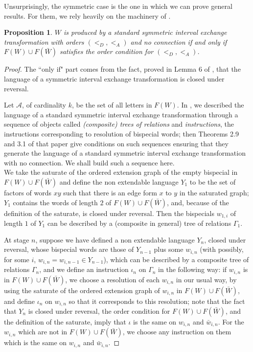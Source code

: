 \documentclass[12pt,a4paper]{amsart}
\newtheorem{proposition}[theorem]{Proposition}
\begin{document}
Unsurprisingly,  the symmetric case is the one in which we can prove general results. For them, we rely heavily on the machinery of  \cite{fz1}.
\begin{proposition}\label{pfls}
  $W$ is produced by 
a standard symmetric  interval exchange transformation with orders $(<_D,<_A)$ and no connection if and only if $F(W)\cup F(\bar W)$ satisfies the order condition for  
$(<_D,<_A)$.\end{proposition}
\begin{proof}
The ``only if" part comes from the fact, proved in  Lemma 6 of  \cite{fz3}, that 
the language of a symmetric interval exchange transformation is closed under reversal.

Let $\mathcal A$, of cardinality $k$, be the set of all letters in  $F(W).$ In \cite{fz1}, we described the language  of a standard symmetric interval exchange transformation through a sequence of objects called {\it (composite) trees of relations} and {\em instructions}, the instructions corresponding to resolution of bispecial words; then Theorems 2.9 and 3.1 of that paper give conditions on such sequences ensuring that they generate the language of a standard symmetric interval exchange transformation with no connection. We shall build such a sequence here.\\

We  take the  saturate of the ordered extension graph of the empty bispecial in $F(W)\cup F(\bar W)$ and define the non extendable language $Y_1$ to be the set of factors of words $xy$ such that there is an edge form $x$ to $y$ in the saturated graph; 
$Y_1$ contains the words of length $2$ of $F(W)\cup F(\bar W)$, and, because of the definition of the saturate, is closed under reversal. Then the bispecials $w_{1,i}$ of length $1$ of $Y_1$ can be described by a (composite in general) tree of relations $\Gamma_1$.

At stage $n$, suppose we have defined a non extendable language $Y_n$, closed under reversal, whose bispecial words are  those of $Y_{n-1}$ plus some $w_{i,n}$ (with possibly, for some $i$,  $w_{i,n}=w_{i,n-1} \in Y_{n-1}$),  which can be described by a composite tree of relations $\Gamma_n$, and we  define an instruction $\iota_n$ on $\Gamma_n$ in the following way: if $w_{i,n}$ is  in $F(W)\cup F(\bar W)$, we choose a resolution of each $w_{i,n}$ in our usual way, by using the saturate of the ordered extension graph of $w_{i,n}$ in $F(W)\cup F(\bar W)$, and define $\iota_n$  on $w_{i,n}$ so that it corresponds to this resolution; note that the fact that $Y_n$ is closed under reversal, the order condition for $F(W)\cup F(\bar W)$, and the definition of the saturate, imply that $\iota$ is the same on  $w_{i,n}$ and  $\bar w_{i,n}$. For the    $w_{i,n}$ which are not  in $F(W)\cup F(\bar W)$,  we choose any instruction on them which  is the same on  $w_{i,n}$ and  $\bar w_{i,n}$.


\end{proof}
\end{document}
